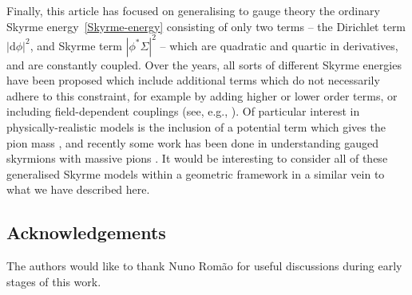 \documentclass[10pt,a4paper]{amsart}
\newcommand{\1}{{\mathbb{1}}}
\def \d{\mathrm{d}}
\numberwithin{equation}{section}
\begin{document}
Finally, this article has focused on generalising to gauge theory the ordinary Skyrme energy~\eqref{Skyrme-energy} consisting of only two terms -- the Dirichlet term $|\d\phi|^2$, and Skyrme term $|\phi^\ast\Sigma|^2$ -- which are quadratic and quartic in derivatives, and are constantly coupled. Over the years, all sorts of different Skyrme energies have been proposed which include additional terms which do not necessarily adhere to this constraint, for example by adding higher or lower order terms, or including field-dependent couplings (see, e.g., \cite{AdamOlesWereszczynski2020dielectric,AdamSanchez-GuillenWereszczynski2010sexticmodel,GudnasonNitta2015baryonic,harland2014topological}). Of particular interest in physically-realistic models is the inclusion of a potential term which gives the pion mass \cite{adkinsNappi1984pionmass}, and recently some work has been done in understanding gauged skyrmions with massive pions \cite{LivramentoRaduShnir2023solitons}. It would be interesting to consider all of these generalised Skyrme models within a geometric framework in a similar vein to what we have described here.
\subsection*{Acknowledgements}
The authors would like to thank Nuno Rom\~ao for useful discussions during early stages of this work.

\end{document}
